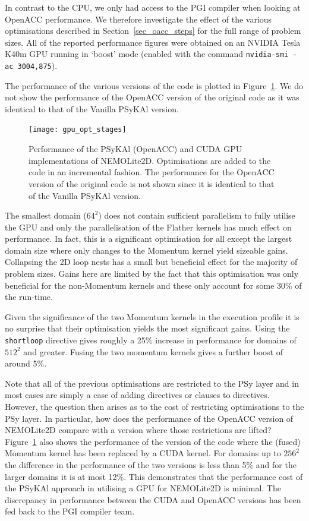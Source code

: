 \documentclass[gmdd, manuscript]{copernicus}
\begin{document}
In contrast to the CPU, we only had access to the PGI compiler when
looking at OpenACC performance. We therefore investigate the effect of
the various optimisations described in Section~\ref{sec_oacc_steps}
for the full range of problem sizes.  All of the reported performance
figures were obtained on an NVIDIA Tesla K40m GPU running in `boost'
mode (enabled with the command \texttt{nvidia-smi -ac 3004,875}).

The performance of the various versions of the code is plotted in
Figure~\ref{FIG_gpu_opt_stages}.  We do not show the performance of
the OpenACC version of the original code as it was identical to that
of the Vanilla {PS}y{KA}l version.

\begin{figure}
\centering
\texttt{[image: gpu\_opt\_stages]}
\caption{Performance of the {PS}y{KA}l (OpenACC) and CUDA GPU
  implementations of NEMOLite2D. Optimisations are added to the code
  in an incremental fashion. The performance for the OpenACC version
  of the original code is not shown since it is identical to that of
  the Vanilla {PS}y{KA}l version.}
\label{FIG_gpu_opt_stages}
\end{figure}

The smallest domain ($64^2$) does not contain sufficient parallelism
to fully utilise the GPU and only the parallelisation of the Flather
kernels has much effect on performance. In fact, this is a significant
optimisation for all except the largest domain size where only changes
to the Momentum kernel yield sizeable gains. Collapsing the 2D loop
nests has a small but beneficial effect for the majority of problem
sizes. Gains here are limited by the fact that this optimisation was
only beneficial for the non-Momentum kernels and these only account
for some 30\% of the run-time.

Given the significance of the two Momentum kernels in the execution
profile it is no surprise that their optimisation yields the most
significant gains. Using the \texttt{shortloop} directive gives
roughly a 25\% increase in performance for domains of $512^2$ and
greater. Fusing the two momentum kernels gives a further boost of
around 5\%. 

Note that all of the previous optimisations are restricted to the PSy
layer and in most cases are simply a case of adding directives or
clauses to directives. However, the question then arises as to the
cost of restricting optimisations to the PSy layer. In particular, how
does the performance of the OpenACC version of NEMOLite2D compare with
a version where those restrictions are lifted?
Figure~\ref{FIG_gpu_opt_stages} also shows the performance of the
version of the code where the (fused) Momentum kernel has been
replaced by a CUDA kernel. For domains up to $256^2$ the difference in
the performance of the two versions is less than 5\% and for the
larger domains it is at most 12\%. This demonstrates that the
performance cost of the {PS}y{KA}l approach in utilising a GPU for
NEMOLite2D is minimal.  The discrepancy in performance between the
CUDA and OpenACC versions has been fed back to the PGI compiler team.
\end{document}
